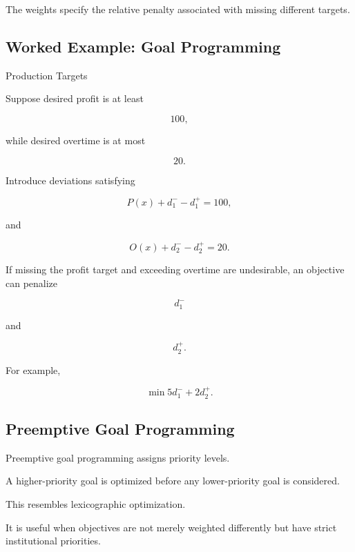 The weights specify the relative penalty associated with missing different
targets.

\subsection{Worked Example: Goal Programming}
\label{subsec:worked-goal-programming}

\begin{workedexamplebox}{Production Targets}

Suppose desired profit is at least

\[
100,
\]

while desired overtime is at most

\[
20.
\]

Introduce deviations satisfying

\[
P(x)
+
d_1^-
-
d_1^+
=
100,
\]

and

\[
O(x)
+
d_2^-
-
d_2^+
=
20.
\]

If missing the profit target and exceeding overtime are undesirable, an
objective can penalize

\[
\boxed{
d_1^-
}
\]

and

\[
\boxed{
d_2^+.
}
\]

For example,

\[
\boxed{
\min
5d_1^-
+
2d_2^+.
}
\]

\end{workedexamplebox}

\subsection{Preemptive Goal Programming}
\label{subsec:preemptive-goal-programming}

Preemptive goal programming assigns priority levels.

A higher-priority goal is optimized before any lower-priority goal is
considered.

This resembles lexicographic optimization.

It is useful when objectives are not merely weighted differently but have
strict institutional priorities.

